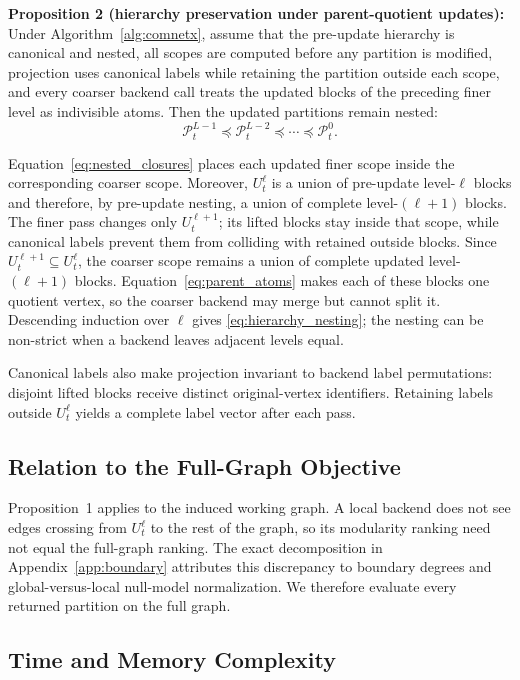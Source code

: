 \documentclass{ieeeaccess}
\begin{document}
\noindent\textbf{Proposition 2 (hierarchy preservation under parent-quotient
updates):} Under Algorithm~\ref{alg:comnetx}, assume that the pre-update
hierarchy is canonical and nested, all scopes are computed before any partition
is modified, projection uses canonical labels while retaining the partition
outside each scope, and every coarser backend call treats the updated blocks of
the preceding finer level as indivisible atoms. Then the updated partitions
remain nested:
\begin{equation}
\mathcal{P}_t^{L-1}\preceq
\mathcal{P}_t^{L-2}\preceq\cdots\preceq\mathcal{P}_t^0.
\label{eq:hierarchy_nesting}
\end{equation}

Equation~\eqref{eq:nested_closures} places each updated finer scope inside the
corresponding coarser scope. Moreover, $U_t^\ell$ is a union of pre-update
level-$\ell$ blocks and therefore, by pre-update nesting, a union of complete
level-$(\ell+1)$ blocks. The finer pass changes only $U_t^{\ell+1}$; its lifted
blocks stay inside that scope, while canonical labels prevent them from
colliding with retained outside blocks. Since
$U_t^{\ell+1}\subseteq U_t^\ell$, the coarser scope remains a union of complete
updated level-$(\ell+1)$ blocks. Equation~\eqref{eq:parent_atoms} makes each of
these blocks one quotient vertex, so the coarser backend may merge but cannot
split it. Descending induction over $\ell$ gives
\eqref{eq:hierarchy_nesting}; the nesting can be non-strict when a backend
leaves adjacent levels equal.

Canonical labels also make projection invariant to backend label permutations:
disjoint lifted blocks receive distinct original-vertex identifiers. Retaining
labels outside $U_t^\ell$ yields a complete label vector after each pass.

\subsection{Relation to the Full-Graph Objective}

Proposition~1 applies to the induced working graph. A local backend does not
see edges crossing from $U_t^\ell$ to the rest of the graph, so its modularity
ranking need not equal the full-graph ranking. The exact decomposition in
Appendix~\ref{app:boundary} attributes this discrepancy to boundary degrees and
global-versus-local null-model normalization. We therefore evaluate every
returned partition on the full graph.

\subsection{Time and Memory Complexity}
\end{document}
